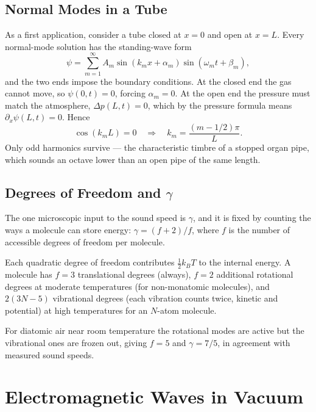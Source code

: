 \subsection{Normal Modes in a Tube}

As a first application, consider a tube closed at $x=0$ and open at $x=L$. Every normal-mode solution has the standing-wave form
\begin{equation}
    \psi = \sum_{m=1}^\infty A_m \sin(k_m x + \alpha_m)\sin(\omega_m t + \beta_m),
\end{equation}
and the two ends impose the boundary conditions. At the closed end the gas cannot move, so $\psi(0,t) = 0$, forcing $\alpha_m = 0$. At the open end the pressure must match the atmosphere, $\Delta p(L,t) = 0$, which by the pressure formula means $\partial_x\psi(L,t) = 0$. Hence
\begin{equation}
    \cos(k_m L) = 0 \quad\Longrightarrow\quad k_m = \frac{(m - 1/2)\pi}{L}.
\end{equation}
Only odd harmonics survive --- the characteristic timbre of a stopped organ pipe, which sounds an octave lower than an open pipe of the same length.

\subsection{Degrees of Freedom and \texorpdfstring{$\gamma$}{gamma}}

The one microscopic input to the sound speed is $\gamma$, and it is fixed by counting the ways a molecule can store energy: $\gamma = (f+2)/f$, where $f$ is the number of accessible degrees of freedom per molecule.

\begin{fact}[Equipartition]
Each quadratic degree of freedom contributes $\tfrac{1}{2}k_B T$ to the internal energy. A molecule has $f = 3$ translational degrees (always), $f = 2$ additional rotational degrees at moderate temperatures (for non-monatomic molecules), and $2(3N-5)$ vibrational degrees (each vibration counts twice, kinetic and potential) at high temperatures for an $N$-atom molecule.
\end{fact}
For diatomic air near room temperature the rotational modes are active but the vibrational ones are frozen out, giving $f = 5$ and $\gamma = 7/5$, in agreement with measured sound speeds.

\section{Electromagnetic Waves in Vacuum}

